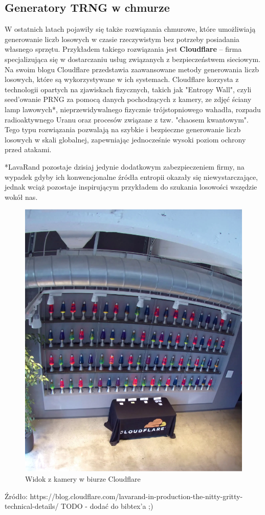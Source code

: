 \subsection{Generatory TRNG w chmurze}

W ostatnich latach pojawiły się także rozwiązania chmurowe, które umożliwiają generowanie liczb losowych w czasie rzeczywistym bez potrzeby posiadania własnego sprzętu. Przykładem takiego rozwiązania jest \textbf{Cloudflare} – firma specjalizująca się w dostarczaniu usług związanych z bezpieczeństwem sieciowym. Na swoim blogu Cloudflare przedstawia zaawansowane metody generowania liczb losowych, które są wykorzystywane w ich systemach.
Cloudflare korzysta z technologii opartych na zjawiskach fizycznych, takich jak "Entropy Wall", czyli seed'owanie PRNG za pomocą danych pochodzących z kamery, ze zdjęć ściany lamp lawowych*,
nieprzewidywalnego fizycznie trójstopniowego wahadła, rozpadu radioaktywnego Uranu oraz procesów związane z tzw. "chaosem kwantowym".
Tego typu rozwiązania pozwalają na szybkie i bezpieczne generowanie liczb losowych w skali globalnej, zapewniając jednocześnie wysoki poziom ochrony przed atakami.

*LavaRand pozostaje dzisiaj jedynie dodatkowym zabezpieczeniem firmy, na wypadek gdyby ich konwencjonalne źródła entropii okazały się niewystarczające, jednak wciąż pozostaje inspirującym przykładem do szukania losowości wszędzie wokół nas.

\begin{figure}[H]
    \centering
    \includegraphics{chapters/02-teoria/figures/lavarandCamera}
    \caption{Widok z kamery w biurze Cloudflare}
    \label{fig:lavarand}
\end{figure}
Źródło: https://blog.cloudflare.com/lavarand-in-production-the-nitty-gritty-technical-details/
TODO - dodać do bibtex'a ;)

